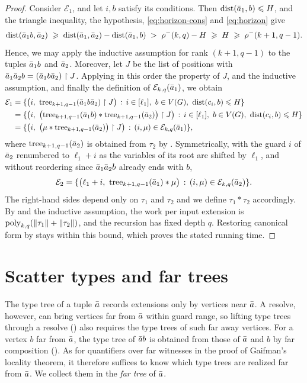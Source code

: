 \begin{proof}
Consider $\mathcal E_1$, and let $i,b$ satisfy its conditions.
Then $\mathrm{dist}(\bar a_1,b)\leqslant H$, and the triangle inequality, the hypothesis, \eqref{eq:horizon-cons} and \eqref{eq:horizon} give
\[
\mathrm{dist}(\bar a_1b,\bar a_2)
\;\geqslant\;\mathrm{dist}(\bar a_1,\bar a_2)-\mathrm{dist}(\bar a_1,b)
\;>\;\rho^-(k,q)-H
\;\geqslant\;H
\;\geqslant\;\rho^-(k+1,q-1).
\]
Hence, we may apply the inductive assumption for rank $(k+1,q-1)$ to the tuples $\bar a_1b$ and $\bar a_2$.
Moreover, let $J$ be the list of positions with $\bar a_1\bar a_2 b=(\bar a_1 b\bar a_2)\restriction J$.
Applying in this order the property of \(J\),  and the inductive assumption, and finally the definition of $\mathcal E_{k,q}(\bar a_1)$, we obtain
\begin{align*}
\mathcal E_1
&=\{\bigl(i,\ \mathrm{tree}_{k+1,q-1}(\bar a_1 b\bar a_2)\restriction J\bigr) \,:\, i\in[\ell_1],\ b\in V(G),\ \mathrm{dist}(c_i,b)\leqslant H \}\\
&=\{\bigl(i,\ \bigl(\mathrm{tree}_{k+1,q-1}(\bar a_1b)\ast\mathrm{tree}_{k+1,q-1}(\bar a_2)\bigr)\restriction J\bigr) \,:\, i\in[\ell_1],\ b\in V(G),\ \mathrm{dist}(c_i,b)\leqslant H \}\\
&=\{\bigl(i,\ \bigl(\mu\ast\mathrm{tree}_{k+1,q-1}(\bar a_2)\bigr)\restriction J\bigr) \,:\, (i,\mu)\in\mathcal E_{k,q}(\bar a_1) \},
\end{align*}
where $\mathrm{tree}_{k+1,q-1}(\bar a_2)$ is obtained from $\tau_2$ by .
Symmetrically, with the guard $i$ of $\bar a_2$ renumbered to $\ell_1+i$ as the variables of its root are shifted by $\ell_1$, and without reordering since $\bar a_1\bar a_2 b$ already ends with $b$,
\[
\mathcal E_2
=\{\bigl(\ell_1+i,\ \mathrm{tree}_{k+1,q-1}(\bar a_1)\ast\mu\bigr) \,:\, (i,\mu)\in\mathcal E_{k,q}(\bar a_2) \}.
\]
The right-hand sides depend only on $\tau_1$ and $\tau_2$ and we define $\tau_1\ast\tau_2$ accordingly.
By  and the inductive assumption, the work per input extension is $\mathrm{poly}_{k,q}(\lVert \tau_1\rVert+\lVert \tau_2\rVert)$, and the recursion has fixed depth $q$. Restoring canonical form by  stays within this bound, which proves the stated running time.
\end{proof}



\section{Scatter types and far trees}\label{sec:localglobal}

The type tree of a tuple $\bar a$ records extensions only by vertices near $\bar a$.
A resolve, however, can bring vertices far from $\bar a$ within guard range, so lifting type trees through a resolve () also requires the type trees of such far away vertices.
For a vertex $b$ far from $\bar a$, the type tree of $\bar ab$ is obtained from those of $\bar a$ and $b$ by far composition ().
As for quantifiers over far witnesses in the proof of Gaifman's locality theorem, it therefore suffices to know which type trees are realized far from $\bar a$.
We collect them in the \emph{far tree} of $\bar a$.


